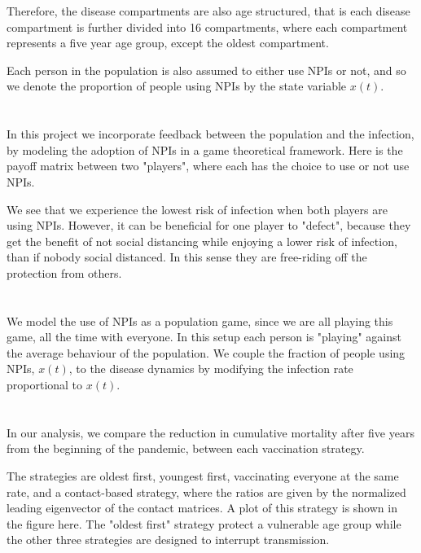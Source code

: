 \documentclass{article}
\begin{document}
Therefore, the disease compartments are also age structured, that is each disease compartment is further divided into 16 compartments, where each compartment represents a five year age group, except the oldest compartment.



Each person in the population is also assumed to either use NPIs or not, and so we denote the proportion of people using NPIs by the state variable $x(t)$.



\section{}
In this project we incorporate feedback between the population and the infection, by modeling the adoption of NPIs in a game theoretical framework. Here is the payoff matrix between two "players", where each has the choice to use or not use NPIs. 

We see that we experience the lowest risk of infection when both players are using NPIs. However, it can be beneficial for one player to "defect", because they get the benefit of not social distancing while enjoying a lower risk of infection, than if nobody social distanced. In this sense they are free-riding off the protection from others.


\section{}

We model the use of NPIs as a population game, since we are all playing this game, all the time with everyone. In this setup each person is "playing" against the average behaviour of the population. We couple the fraction of people using NPIs, $x(t)$,  to the disease dynamics by modifying the infection rate proportional to $x(t)$.

\section{}

In our analysis, we compare the reduction in  cumulative mortality after five years from the beginning of the pandemic, between each vaccination strategy.

The strategies are oldest first, youngest first, vaccinating everyone at the same rate, and a contact-based strategy, where the ratios are given by the normalized leading eigenvector of the contact matrices. A plot of this strategy is shown in the figure here. The "oldest first" strategy protect a vulnerable age group while the other three strategies are designed to interrupt transmission.
\end{document}
